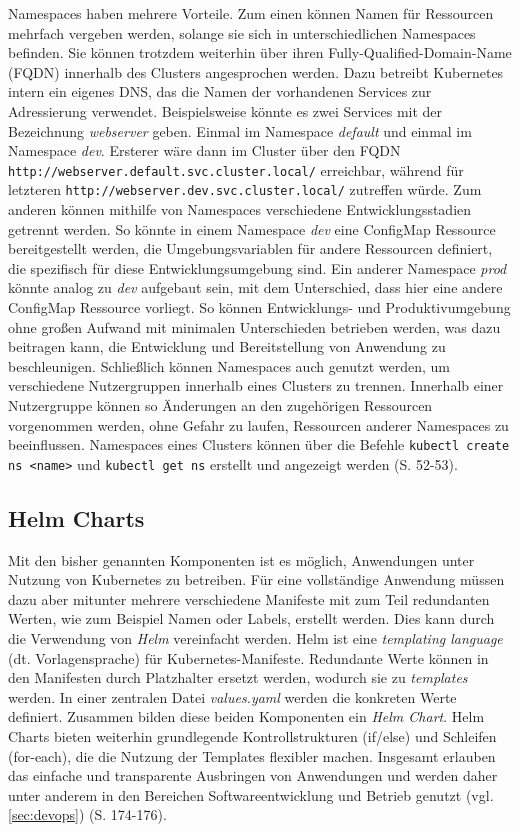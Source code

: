 \documentclass[11pt,a4paper]{article}
\begin{document}
Namespaces haben mehrere Vorteile. Zum einen können Namen für Ressourcen mehrfach vergeben werden,
solange sie sich in unterschiedlichen Namespaces befinden. Sie können trotzdem weiterhin
über ihren Fully-Qualified-Domain-Name (FQDN) innerhalb des Clusters angesprochen werden.
Dazu betreibt Kubernetes intern ein eigenes DNS, das die Namen
der vorhandenen Services zur Adressierung verwendet.
Beispielsweise könnte es zwei Services mit der Bezeichnung \emph{webserver} geben.
Einmal im Namespace \emph{default} und einmal im Namespace \emph{dev}.
Ersterer wäre dann im Cluster über den FQDN \lstinline|http://webserver.default.svc.cluster.local/|
erreichbar, während für letzteren \lstinline|http://webserver.dev.svc.cluster.local/| zutreffen würde.
Zum anderen können mithilfe von Namespaces verschiedene Entwicklungsstadien getrennt werden.
So könnte in einem Namespace \emph{dev} eine ConfigMap Ressource bereitgestellt werden,
die Umgebungsvariablen für andere Ressourcen definiert, die spezifisch für diese
Entwicklungsumgebung sind. Ein anderer Namespace \emph{prod} könnte analog zu \emph{dev}
aufgebaut sein, mit dem Unterschied, dass hier eine andere ConfigMap Ressource vorliegt.
So können Entwicklungs- und Produktivumgebung ohne großen Aufwand mit minimalen Unterschieden betrieben
werden, was dazu beitragen kann, die Entwicklung und Bereitstellung von Anwendung zu beschleunigen.
Schließlich können Namespaces auch genutzt werden, um verschiedene Nutzergruppen innerhalb eines Clusters
zu trennen. Innerhalb einer Nutzergruppe können so Änderungen an den zugehörigen Ressourcen vorgenommen werden,
ohne Gefahr zu laufen, Ressourcen anderer Namespaces zu beeinflussen.
Namespaces eines Clusters können über die Befehle \lstinline|kubectl create ns <name>| und
\lstinline|kubectl get ns| erstellt und angezeigt werden \cite{Schmeling_Dargatz_2022} (S. 52-53).

\subsection{Helm Charts}
Mit den bisher genannten Komponenten ist es möglich, Anwendungen unter Nutzung von
Kubernetes zu betreiben. Für eine vollständige Anwendung müssen dazu aber mitunter
mehrere verschiedene Manifeste mit zum Teil redundanten Werten, wie zum Beispiel
Namen oder Labels, erstellt werden.
Dies kann durch die Verwendung von \emph{Helm} vereinfacht werden. %
Helm ist eine \emph{templating language} (dt. Vorlagensprache) für
Kubernetes-Manifeste. Redundante Werte können in den Manifesten
durch Platzhalter ersetzt werden, wodurch sie zu \emph{templates} werden.
In einer zentralen Datei \emph{values.yaml} werden die konkreten Werte definiert.
Zusammen bilden diese beiden Komponenten ein \emph{Helm Chart}.
Helm Charts bieten weiterhin grundlegende Kontrollstrukturen (if/else) und Schleifen (for-each),
die die Nutzung der Templates flexibler machen.
Insgesamt erlauben das einfache und transparente Ausbringen von Anwendungen
und werden daher unter anderem in den Bereichen Softwareentwicklung und Betrieb genutzt
(vgl. \ref{sec:devops}) \cite{Schmeling_Dargatz_2022} (S. 174-176).
\end{document}
